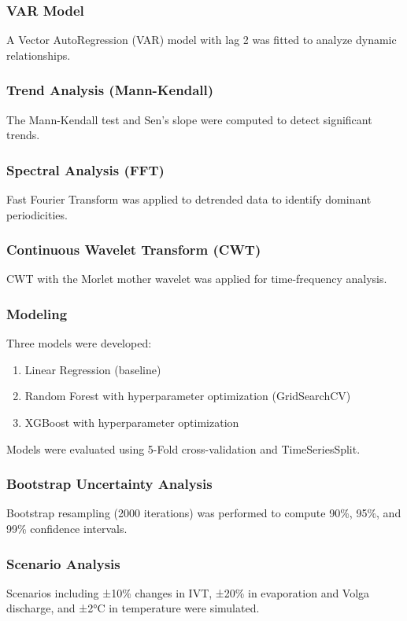 \documentclass[12pt,letterpaper]{article}
\begin{document}
\subsubsection{VAR Model}
A Vector AutoRegression (VAR) model with lag 2 was fitted to analyze dynamic relationships.

\subsubsection{Trend Analysis (Mann-Kendall)}
The Mann-Kendall test and Sen's slope were computed to detect significant trends.

\subsubsection{Spectral Analysis (FFT)}
Fast Fourier Transform was applied to detrended data to identify dominant periodicities.

\subsubsection{Continuous Wavelet Transform (CWT)}
CWT with the Morlet mother wavelet was applied for time-frequency analysis.

\subsubsection{Modeling}
Three models were developed:
\begin{enumerate}
\item Linear Regression (baseline)
\item Random Forest with hyperparameter optimization (GridSearchCV)
\item XGBoost with hyperparameter optimization
\end{enumerate}

Models were evaluated using 5-Fold cross-validation and TimeSeriesSplit.

\subsubsection{Bootstrap Uncertainty Analysis}
Bootstrap resampling (2000 iterations) was performed to compute 90\%, 95\%, and 99\% confidence intervals.

\subsubsection{Scenario Analysis}
Scenarios including ±10\% changes in IVT, ±20\% in evaporation and Volga discharge, and ±2°C in temperature were simulated.
\end{document}
